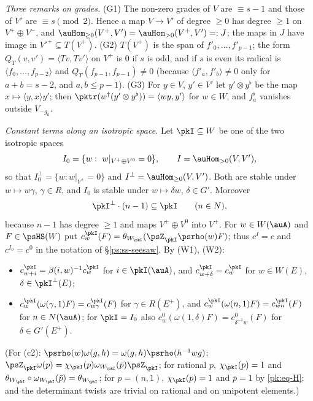 \documentclass[10pt]{amsart}
\theoremstyle{definition}
\theoremstyle{remark}
\begin{document}
\emph{Three remarks on grades.} (G1) The non-zero grades of $V$ are $\equiv s-1$ and those of $V'$
are $\equiv s\pmod2$. Hence a map $V\to V'$ of degree $\ge0$ has degree $\ge1$ on $V^+\oplus V^-$,
and $\auHom_{\ge0}(V^+,V')=\auHom_{>0}(V^+,V')=:J$; the maps in $J$ have image in
$V'^{+}\subseteq T(V^+)$. (G2) $T(V^+)$ is the span of $f'_0,\dots,f'_{p-1}$; the form
$Q_T(v,v')=\langle Tv,Tv'\rangle$ on $V^+$ is $0$ if $s$ is odd, and if $s$ is even its radical is
$\langle f_0,\dots,f_{p-2}\rangle$ and $Q_T(f_{p-1},f_{p-1})\ne0$ (because $\langle f'_a,f'_b\rangle
\ne0$ only for $a+b=s-2$, and $a,b\le p-1$). (G3) For $y\in V$, $y'\in V'$ let $y'\otimes y^\flat$
be the map $x\mapsto\langle y,x\rangle y'$; then $\pktr(w^\dagger(y'\otimes y^\flat))=\langle wy,y'
\rangle$ for $w\in W$, and $f_a^\flat$ vanishes outside $V_{-g_a}$.

\emph{Constant terms along an isotropic space.} Let $\pkI\subseteq W$ be one of the two isotropic
spaces
\[
I_0=\{w:\ w|_{V^+\oplus V^0}=0\},\qquad I=\auHom_{>0}(V,V'),
\]
so that $I_0^\perp=\{w:w|_{V^+}=0\}$ and $I^\perp=\auHom_{\ge0}(V,V')$. Both are stable under
$w\mapsto w\gamma$, $\gamma\in R$, and $I_0$ is stable under $w\mapsto\delta w$, $\delta\in G'$.
Moreover
\begin{equation}\label{pk:eq-H}
\pkI^\perp\cdot(n-1)\subseteq\pkI\qquad(n\in N),
\end{equation}
because $n-1$ has degree $\ge1$ and maps $V^+\oplus V^0$ into $V^+$. For $w\in W(\auA)$ and
$F\in\psHS(W)$ put $c^{\pkI}_w(F)=\theta_{W_{\pkI}}(\psZ_{\pkI}\psrho(w)F)$; thus $c^I=c$ and
$c^{I_0}=c^0$ in the notation of \S\ref{ps:ss-seesaw}. By (W1), (W2):
\begin{itemize}
\item[(c1)] $c^{\pkI}_{w+i}=\beta(i,w)^{-1}c^{\pkI}_w$ for $i\in\pkI(\auA)$, and $c^{\pkI}_{w+\delta}=
c^{\pkI}_w$ for $w\in W(E)$, $\delta\in\pkI^\perp(E)$;
\item[(c2)] $c^{\pkI}_w(\omega(\gamma,1)F)=c^{\pkI}_{w\gamma}(F)$ for $\gamma\in R(E^+)$, and
$c^{\pkI}_w(\omega(n,1)F)=c^{\pkI}_{wn}(F)$ for $n\in N(\auA)$; for $\pkI=I_0$ also
$c^{0}_w(\omega(1,\delta)F)=c^{0}_{\delta^{-1}w}(F)$ for $\delta\in G'(E^+)$.
\end{itemize}
(For (c2): $\psrho(w)\omega(g,h)=\omega(g,h)\psrho(h^{-1}wg)$; $\psZ_{\pkI}\omega(p)=\chi_{\pkI}(p)
\omega_{W_{\pkI}}(\bar p)\psZ_{\pkI}$; for rational $p$, $\chi_{\pkI}(p)=1$ and
$\theta_{W_{\pkI}}\circ\omega_{W_{\pkI}}(\bar p)=\theta_{W_{\pkI}}$; for $p=(n,1)$, $\chi_{\pkI}(p)=1$
and $\bar p=1$ by \eqref{pk:eq-H}; and the determinant twists are trivial on rational and on
unipotent elements.)
\end{document}
